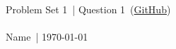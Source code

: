 \documentclass{article}
\begin{document}
    \def\problemSet{1}
    \def\question{1}
    \def\name{Name}

    \begin{center}
        \large{Problem Set \problemSet\ | Question \question\ (\href{https://github.com/zhaoshenzhai/CatTheory-F23}{GitHub})}\\\ \\
        \normalsize{\name\ | \today}
    \end{center}

    \setcounter{exercise}{\question-1}

    \begin{exercise}
        
    \end{exercise}
    \begin{solution}
        
    \end{solution}
\end{document}
